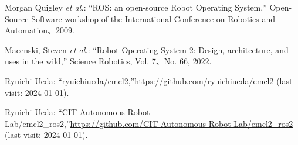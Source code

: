 \documentclass[twocolumn,9pt]{jsproceedings}
\begin{document}
\footnotesize
\begin{thebibliography}{99}
  Morgan Quigley {\it et al.}: ``ROS: an open-source Robot Operating System,''
  Open-Source Software workshop of the International Conference on Robotics and Automation、2009.

  Macenski, Steven {\it et al.}: ``Robot Operating System 2: Design, architecture, and uses in the wild,''
  Science Robotics, Vol. 7、No. 66, 2022.










  Ryuichi Ueda: ``ryuichiueda/emcl2,''\url{https://github.com/ryuichiueda/emcl2} (last visit: 2024-01-01).

  Ryuichi Ueda: ``CIT-Autonomous-Robot-Lab/emcl2\_ros2,''\url{https://github.com/CIT-Autonomous-Robot-Lab/emcl2_ros2} (last visit: 2024-01-01).


\end{thebibliography}
\end{document}
